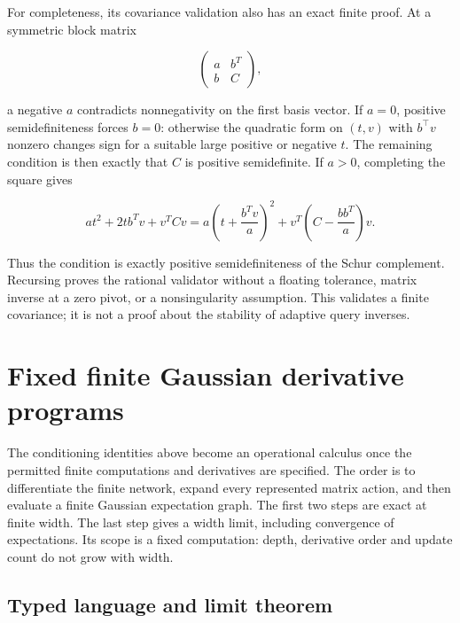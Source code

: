 \documentclass[
  11pt,
]{article}
\theoremstyle{definition}
\theoremstyle{plain}
\theoremstyle{plain}
\theoremstyle{plain}
\theoremstyle{remark}
\begin{document}
For completeness, its covariance validation also has an exact finite
proof. At a symmetric block matrix

\[
\begin{pmatrix}a&b^T\\ b&C\end{pmatrix},
\]

a negative \(a\) contradicts nonnegativity on the first basis vector. If
\(a=0\), positive semidefiniteness forces \(b=0\): otherwise the
quadratic form on \((t,v)\) with \(b^{\top}v\) nonzero changes sign for
a suitable large positive or negative \(t\). The remaining condition is
then exactly that \(C\) is positive semidefinite. If \(a>0\), completing
the square gives

\[
a t^2+2t b^Tv+v^TCv
=a\left(t+\frac{b^Tv}{a}\right)^2
+v^T\left(C-\frac{bb^T}{a}\right)v.
\]

Thus the condition is exactly positive semidefiniteness of the Schur
complement. Recursing proves the rational validator without a floating
tolerance, matrix inverse at a zero pivot, or a nonsingularity
assumption. This validates a finite covariance; it is not a proof about
the stability of adaptive query inverses.

\section{Fixed finite Gaussian derivative
programs}\label{sec-mfp-finite-derivative-programs}

The conditioning identities above become an operational calculus once
the permitted finite computations and derivatives are specified. The
order is to differentiate the finite network, expand every represented
matrix action, and then evaluate a finite Gaussian expectation graph.
The first two steps are exact at finite width. The last step gives a
width limit, including convergence of expectations. Its scope is a fixed
computation: depth, derivative order and update count do not grow with
width.

\subsection{Typed language and limit
theorem}\label{sec-mfp-program-language}
\end{document}
